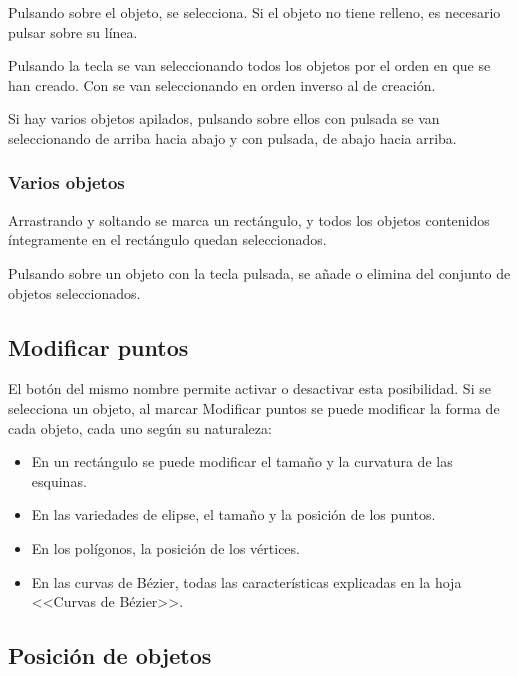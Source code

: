Pulsando sobre el objeto, se selecciona. Si el objeto no tiene
relleno, es necesario pulsar sobre su línea.

Pulsando la tecla  se van seleccionando todos los objetos
por el orden en que se han creado. Con  se van
seleccionando en orden inverso al de creación.

Si hay varios objetos apilados, pulsando sobre ellos con 
pulsada se van seleccionando de arriba hacia abajo y con
 pulsada, de abajo hacia arriba.

\subsubsection{Varios objetos}

Arrastrando y soltando se marca un rectángulo, y todos los objetos
contenidos íntegramente en el rectángulo quedan seleccionados.

Pulsando sobre un objeto con la tecla  pulsada, se añade
o elimina del conjunto de objetos seleccionados.

\subsection{Modificar puntos}

El botón del mismo nombre permite activar o desactivar esta
posibilidad. Si se selecciona un objeto, al marcar Modificar puntos se
puede modificar la forma de cada objeto, cada uno según su naturaleza:

\begin{itemize}
\item En un rectángulo se puede modificar el tamaño y la curvatura 
de las esquinas.

\item En las variedades de elipse, el tamaño y la posición de los 
puntos.

\item En los polígonos, la posición de los vértices.

\item En las curvas de Bézier, todas las características explicadas 
en la hoja <<Curvas de Bézier>>.
\end{itemize}

\subsection{Posición de objetos}

